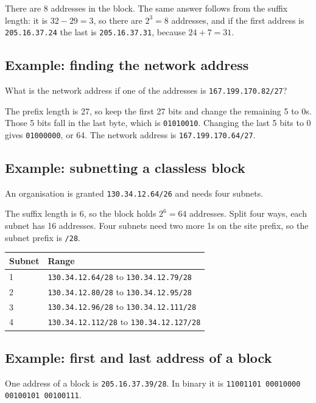 \documentclass[11pt,a4paper]{article}
\begin{document}
There are 8 addresses in the block. The same answer follows from the suffix length: it is
$32 - 29 = 3$, so there are $2^{3} = 8$ addresses, and if the first address is
\texttt{205.16.37.24} the last is \texttt{205.16.37.31}, because $24 + 7 = 31$.

\subsection*{Example: finding the network address}

What is the network address if one of the addresses is \texttt{167.199.170.82/27}?

The prefix length is 27, so keep the first 27 bits and change the remaining 5 to 0s. Those 5
bits fall in the last byte, which is \texttt{01010010}. Changing the last 5 bits to 0 gives
\texttt{01000000}, or 64. The network address is \texttt{167.199.170.64/27}.

\subsection*{Example: subnetting a classless block}

An organisation is granted \texttt{130.34.12.64/26} and needs four subnets.

The suffix length is 6, so the block holds $2^{6} = 64$ addresses. Split four ways, each
subnet has 16 addresses. Four subnets need two more 1s on the site prefix, so the subnet
prefix is \texttt{/28}.

\begin{tabularx}{\textwidth}{@{}lX@{}}
\toprule
\rowcolor{tablehead}\textbf{Subnet} & \textbf{Range} \\
\midrule
1 & \texttt{130.34.12.64/28} to \texttt{130.34.12.79/28} \\
2 & \texttt{130.34.12.80/28} to \texttt{130.34.12.95/28} \\
3 & \texttt{130.34.12.96/28} to \texttt{130.34.12.111/28} \\
4 & \texttt{130.34.12.112/28} to \texttt{130.34.12.127/28} \\
\bottomrule
\end{tabularx}

\subsection*{Example: first and last address of a block}

One address of a block is \texttt{205.16.37.39/28}. In binary it is
\texttt{11001101 00010000 00100101 00100111}.
\end{document}
